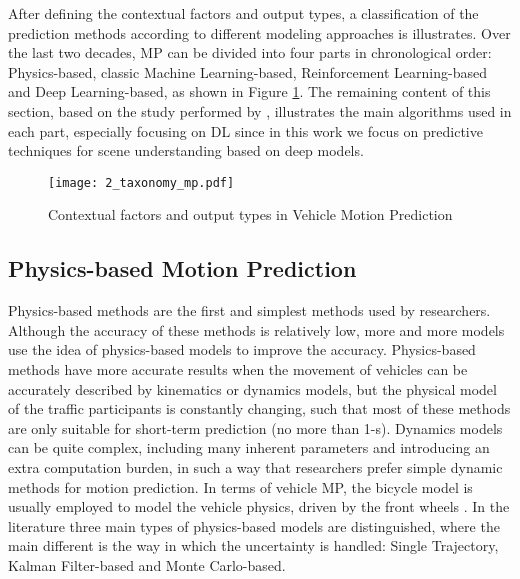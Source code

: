 After defining the contextual factors and output types, a classification of the prediction methods according to different modeling approaches is illustrates. Over the last two decades, \ac{MP} can be divided into four parts in chronological order: Physics-based, classic Machine Learning-based, Reinforcement Learning-based and Deep Learning-based, as shown in Figure \ref{fig:2_taxonomy_mp}. The remaining content of this section, based on the study performed by \cite{huang2022survey}, illustrates the main algorithms used in each part, especially focusing on \ac{DL} since in this work we focus on predictive techniques for scene understanding based on deep models.

\begin{figure}[h]
	\centering
	\texttt{[image: 2\_taxonomy\_mp.pdf]}
	\caption{Contextual factors and output types in Vehicle Motion Prediction}
	\label{fig:2_taxonomy_mp}
\end{figure}

\subsection{Physics-based Motion Prediction}
\label{subsec:2_physics_based_mp}

Physics-based methods are the first and simplest methods used by researchers. Although the accuracy of these methods is relatively low, more and more models use the idea of physics-based models to improve the accuracy. Physics-based methods have more accurate results when the movement of vehicles can be accurately described by kinematics or dynamics models, but the physical model of the traffic participants is constantly changing, such that most of these methods are only suitable for short-term prediction (no more than 1-s). Dynamics models can be quite complex, including many inherent parameters and introducing an extra computation burden, in such a way that researchers prefer simple dynamic methods for motion prediction. In terms of vehicle \ac{MP}, the bicycle model is usually employed to model the vehicle physics, driven by the front wheels \cite{kaempchen2009situation, pepy2006reducing}. In the literature three main types of physics-based models are distinguished, where the main different is the way in which the uncertainty is handled: Single Trajectory, Kalman Filter-based and Monte Carlo-based.

